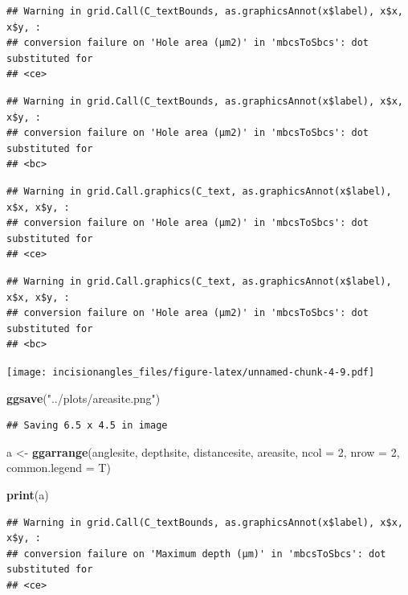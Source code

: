 \documentclass[
]{article}
\newenvironment{Shaded}{\begin{snugshade}}{\end{snugshade}}
\newcommand{\AttributeTok}[1]{\textcolor[rgb]{0.13,0.29,0.53}{#1}}
\newcommand{\DecValTok}[1]{\textcolor[rgb]{0.00,0.00,0.81}{#1}}
\newcommand{\FunctionTok}[1]{\textcolor[rgb]{0.13,0.29,0.53}{\textbf{#1}}}
\newcommand{\NormalTok}[1]{#1}
\newcommand{\OtherTok}[1]{\textcolor[rgb]{0.56,0.35,0.01}{#1}}
\newcommand{\StringTok}[1]{\textcolor[rgb]{0.31,0.60,0.02}{#1}}
\begin{document}
\begin{verbatim}
## Warning in grid.Call(C_textBounds, as.graphicsAnnot(x$label), x$x, x$y, :
## conversion failure on 'Hole area (μm2)' in 'mbcsToSbcs': dot substituted for
## <ce>
\end{verbatim}

\begin{verbatim}
## Warning in grid.Call(C_textBounds, as.graphicsAnnot(x$label), x$x, x$y, :
## conversion failure on 'Hole area (μm2)' in 'mbcsToSbcs': dot substituted for
## <bc>
\end{verbatim}

\begin{verbatim}
## Warning in grid.Call.graphics(C_text, as.graphicsAnnot(x$label), x$x, x$y, :
## conversion failure on 'Hole area (μm2)' in 'mbcsToSbcs': dot substituted for
## <ce>
\end{verbatim}

\begin{verbatim}
## Warning in grid.Call.graphics(C_text, as.graphicsAnnot(x$label), x$x, x$y, :
## conversion failure on 'Hole area (μm2)' in 'mbcsToSbcs': dot substituted for
## <bc>
\end{verbatim}

\texttt{[image: incisionangles\_files/figure-latex/unnamed-chunk-4-9.pdf]}

\begin{Shaded}
\begin{Highlighting}[]
\FunctionTok{ggsave}\NormalTok{(}\StringTok{"../plots/areasite.png"}\NormalTok{)}
\end{Highlighting}
\end{Shaded}

\begin{verbatim}
## Saving 6.5 x 4.5 in image
\end{verbatim}

\begin{Shaded}
\begin{Highlighting}[]
\NormalTok{a }\OtherTok{\textless{}{-}} \FunctionTok{ggarrange}\NormalTok{(anglesite, depthsite, distancesite, areasite, }\AttributeTok{ncol =} \DecValTok{2}\NormalTok{, }\AttributeTok{nrow =} \DecValTok{2}\NormalTok{, }\AttributeTok{common.legend =}\NormalTok{ T)}

\FunctionTok{print}\NormalTok{(a)}
\end{Highlighting}
\end{Shaded}

\begin{verbatim}
## Warning in grid.Call(C_textBounds, as.graphicsAnnot(x$label), x$x, x$y, :
## conversion failure on 'Maximum depth (μm)' in 'mbcsToSbcs': dot substituted for
## <ce>
\end{verbatim}
\end{document}
